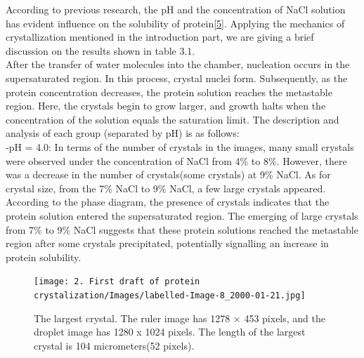 \documentclass[a4paper,english,12pt,bibliography=totoc]{scrreprt}
\begin{document}
According to previous research, the pH and the concentration of NaCl solution has evident influence on the solubility of protein\hyperref[sec:ref_5]{[5]}. Applying the mechanics of crystallization mentioned in the introduction part, we are giving a brief discussion on the results shown in table 3.1.\\

After the transfer of water molecules into the chamber, nucleation occurs in the supersaturated region. In this process, crystal nuclei form. Subsequently, as the protein concentration decreases, the protein solution reaches the metastable region. Here, the crystals begin to grow larger, and growth halts when the concentration of the solution equals the saturation limit. The description and analysis of each group (separated by pH) is as follows:\\


-pH = 4.0: In terms of the number of crystals in the images, many small crystals were observed under the concentration of NaCl from 4\% to 8\%. However, there was a decrease in the number of crystals(some crystals) at 9\% NaCl. As for crystal size, from the 7\% NaCl to 9\% NaCl, a few large crystals appeared. According to the phase diagram, the presence of crystals indicates that the protein solution entered the supersaturated region. The emerging of large crystals from 7\% to 9\% NaCl suggests that these protein solutions reached the metastable region after some crystals precipitated, potentially signalling an increase in protein solubility.



\begin{figure}[H]
        \centering
        \texttt{[image: 2. First draft of protein crystalization/Images/labelled-Image-8\_2000-01-21.jpg]}
	    \caption{The largest crystal. The ruler image has 1278 × 453 pixels, and the droplet image has 1280 x 1024 pixels. The length of the largest crystal is 104 micrometers(52 pixels).  }
\end{figure}
\end{document}

